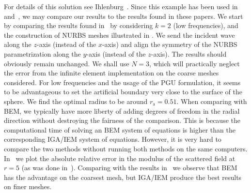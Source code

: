 For details of this solution see Ihlenburg~\cite[p. 28]{Ihlenburg1998fea}. Since this example has been used in~\cite{Gerdes1999otp} and~\cite{Simpson2014aib}, we may compare our results to the results found in these papers. We start by comparing the results found in~\cite{Simpson2014aib} by considering $k=2$ (low frequencies), and the construction of NURBS meshes illustrated in . We send the incident wave along the $z$-axis (instead of the $x$-axis) and align the symmetry of the NURBS parametrization along the $y$-axis (instead of the $z$-axis). The results should obviously remain unchanged. We shall use $N=3$, which will practically neglect the error from the infinite element implementation on the coarse meshes considered. For low frequencies and the usage of the PGU formulation, it seems to be advantageous to set the artificial boundary very close to the surface of the sphere. We find the optimal radius to be around $r_{\mathrm{a}}=0.51$. When comparing with BEM, we typically have more liberty of adding degrees of freedom in the radial direction without destroying the fairness of the comparison. This is because the computational time of solving an BEM system of equations is higher than the corresponding IGA/IEM system of equations. However, it is very hard to compare the two methods without running both methods on the same computers. In~ we plot the absolute relative error in the modulus of the scattered field at $r=5$ (as was done in~\cite{Simpson2014aib}). Comparing with the results in~\cite{Simpson2014aib} we observe that BEM has the advantage on the coarsest mesh, but IGA/IEM produce the best results on finer meshes. 
